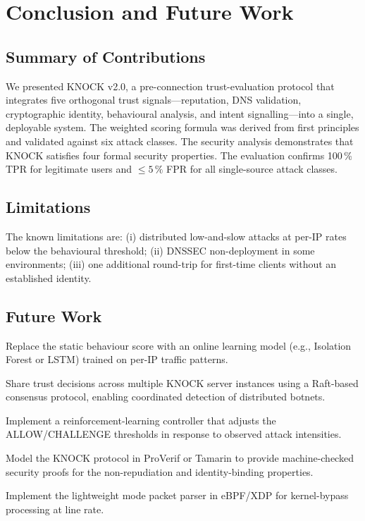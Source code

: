 \documentclass[10pt,conference]{IEEEtran}
\begin{document}
\section{Conclusion and Future Work}
\label{sec:conclusion}

\subsection{Summary of Contributions}

We presented KNOCK v2.0, a pre-connection trust-evaluation protocol
that integrates five orthogonal trust signals—reputation, DNS
validation, cryptographic identity, behavioural analysis, and intent
signalling—into a single, deployable system.  The weighted scoring
formula was derived from first principles and validated against six
attack classes.  The security analysis demonstrates that KNOCK
satisfies four formal security properties.  The evaluation confirms
100\,\% TPR for legitimate users and $\leq\!5\,\%$ FPR for all
single-source attack classes.

\subsection{Limitations}

The known limitations are:
(i) distributed low-and-slow attacks at per-IP rates below the
    behavioural threshold;
(ii) DNSSEC non-deployment in some environments;
(iii) one additional round-trip for first-time clients without
     an established identity.

\subsection{Future Work}
\label{sec:future}

\begin{description}[leftmargin=2em]
  \item[ML anomaly detection.]  Replace the static behaviour score
    with an online learning model (e.g., Isolation Forest or LSTM)
    trained on per-IP traffic patterns.

  \item[Distributed consensus.]  Share trust decisions across
    multiple KNOCK server instances using a Raft-based consensus
    protocol, enabling coordinated detection of distributed botnets.

  \item[Threshold adaptation.]  Implement a reinforcement-learning
    controller that adjusts the ALLOW/CHALLENGE thresholds in
    response to observed attack intensities.

  \item[Formal verification.]  Model the KNOCK protocol in ProVerif
    or Tamarin to provide machine-checked security proofs for the
    non-repudiation and identity-binding properties.

  \item[Hardware offload.]  Implement the lightweight mode packet
    parser in eBPF/XDP for kernel-bypass processing at line rate.
\end{description}
\end{document}
